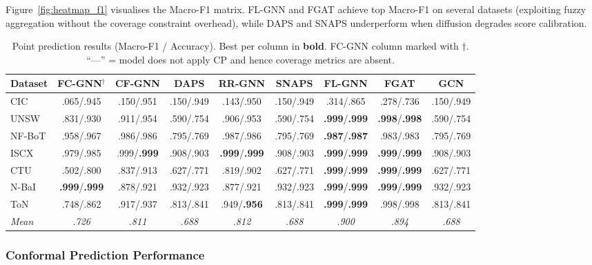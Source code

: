 Figure~\ref{fig:heatmap_f1} visualises the Macro-F1 matrix.
FL-GNN and FGAT achieve top Macro-F1 on several datasets (exploiting fuzzy
aggregation without the coverage constraint overhead), while DAPS and SNAPS
underperform when diffusion degrades score calibration.

\begin{table}[t]
\caption{Point prediction results (Macro-F1 / Accuracy).
         Best per column in \textbf{bold}. FC-GNN column marked with $\dagger$.
         ``---'' = model does not apply CP and hence coverage metrics are absent.}
\label{tab:f1_main}
\setlength{\tabcolsep}{0.5pt}
\scriptsize
\begin{tabular}{lcccccccc}
\toprule
Dataset & FC-GNN$^\dagger$ & CF-GNN & DAPS & RR-GNN & SNAPS & FL-GNN & FGAT & GCN \\
\midrule
CIC    & .065/.945 & .150/.951 & .150/.949 & .143/.950 & .150/.949 & .314/.865 & .278/.736 & .150/.949 \\
UNSW   & .831/.930 & .911/.954 & .590/.754 & .906/.953 & .590/.754 & \textbf{.999}/\textbf{.999} & \textbf{.998}/\textbf{.998} & .590/.754 \\
NF-BoT & .958/.967 & .986/.986 & .795/.769 & .987/.986 & .795/.769 & \textbf{.987}/\textbf{.987} & .983/.983 & .795/.769 \\
ISCX   & .979/.985 & .999/\textbf{.999} & .908/.903 & \textbf{.999}/\textbf{.999} & .908/.903 & \textbf{.999}/\textbf{.999} & \textbf{.999}/\textbf{.999} & .908/.903 \\
CTU    & .502/.800 & .837/.913 & .627/.771 & .819/.902 & .627/.771 & \textbf{.999}/\textbf{.999} & \textbf{.999}/\textbf{.999} & .627/.771 \\
N-BaI  & \textbf{.999}/\textbf{.999} & .878/.921 & .932/.923 & .877/.921 & .932/.923 & \textbf{.999}/\textbf{.999} & \textbf{.999}/\textbf{.999} & .932/.923 \\
ToN    & .748/.862 & .917/.937 & .813/.841 & .949/\textbf{.956} & .813/.841 & \textbf{.999}/\textbf{.999} & .998/.998 & .813/.841 \\
\midrule
\textit{Mean} & \textit{.726} & \textit{.811} & \textit{.688} & \textit{.812} & \textit{.688} & \textit{.900} & \textit{.894} & \textit{.688} \\
\bottomrule
\end{tabular}
\end{table}

\subsubsection{Conformal Prediction Performance}

